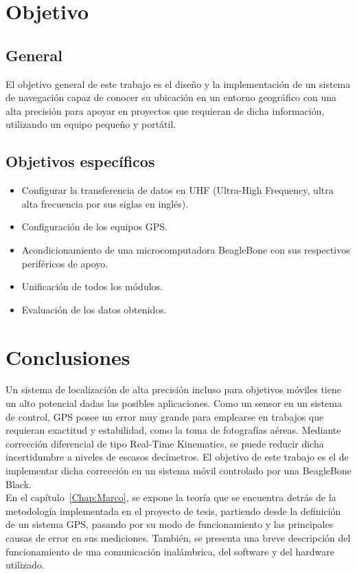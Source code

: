 \section{Objetivo}
\subsection{General}
El objetivo general de este trabajo es el diseño y la implementación de un sistema de navegación capaz de conocer su ubicación en un entorno geográfico con una alta precisión para apoyar en proyectos que requieran de dicha información, utilizando un equipo pequeño y portátil.

\subsection{Objetivos específicos}
\begin{itemize}
    \item Configurar la transferencia de datos en UHF (Ultra-High Frequency, ultra alta frecuencia por sus siglas en inglés).
    \item Configuración de los equipos GPS.
    \item Acondicionamiento de una microcomputadora BeagleBone con sus respectivos periféricos de apoyo.
    \item Unificación de todos los módulos.
	\item Evaluación de los datos obtenidos.    
\end{itemize}

\section{Conclusiones}

Un sistema de localización de alta precisión incluso para objetivos móviles tiene un alto potencial dadas las posibles aplicaciones. Como un sensor en un sistema de control, GPS posee un error muy grande para emplearse en trabajos que requieran exactitud y estabilidad, como la toma de fotografías aéreas. Mediante corrección diferencial de tipo Real-Time Kinematics, se puede reducir dicha incertidumbre a niveles de escasos decímetros. El objetivo de este trabajo es el de implementar dicha corrección en un sistema móvil controlado por una BeagleBone Black.\\

En el capítulo~\ref{Chap:Marco}, se expone la teoría que se encuentra detrás de la metodología implementada en el proyecto de tesis, partiendo desde la definición de un sistema GPS, pasando por su modo de funcionamiento y las principales causas de error en sus mediciones. También, se presenta una breve descripción del funcionamiento de una comunicación inalámbrica, del software y del hardware utilizado.